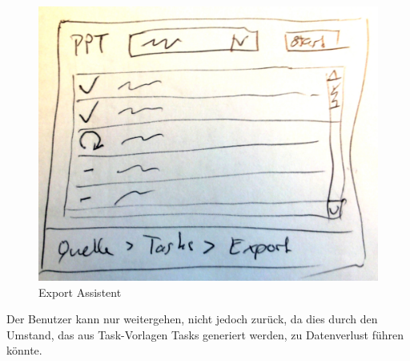 \begin{figure}[H]
\begin{minipage}[b]{0.30\linewidth}
		\end{minipage}
		\begin{minipage}[b]{0.34\linewidth}
			\includegraphics[width=\linewidth]{interfacesAndProtocols/media/img/export3.jpg}
		\end{minipage}
		\caption{Export Assistent}
		\label{fig:exportAssistent}
	\end{figure}	
	
	Der Benutzer kann nur weitergehen, nicht jedoch zurück, da dies durch den Umstand, 
	das aus Task-Vorlagen Tasks generiert werden, 
	zu Datenverlust führen könnte.